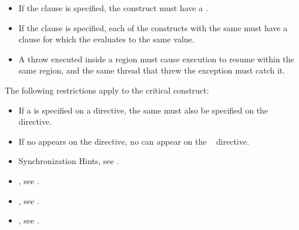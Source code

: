\restrictions
\begin{itemize}
\item If the  clause is specified, the 
      construct must have a .
\item If the  clause is specified, each of the
   constructs with the same  must have a
   clause for which the  evaluates to the same
  value.

\end{itemize}

\begin{cppspecific}
\begin{itemize}
\item A throw executed inside a  region must cause execution to resume within
the same  region, and the same thread that threw the exception must catch
it.
\end{itemize}
\end{cppspecific}

\vspace{-6pt} %
\begin{fortranspecific}
The following restrictions apply to the critical construct:

\begin{itemize}
\item If a  is specified on a  directive, the same  must also be
specified on the ~ directive.

\item If no  appears on the  directive, no  can appear on the
~ directive.
\end{itemize}
\end{fortranspecific}

\crossreferences
\begin{itemize}
\item Synchronization Hints, see
.

\item {}, see
.

\item {}, see
.

\item {}, see
.

\end{itemize}









